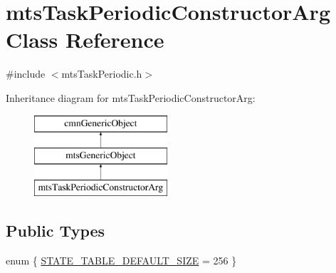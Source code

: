 \hypertarget{classmts_task_periodic_constructor_arg}{\section{mts\-Task\-Periodic\-Constructor\-Arg Class Reference}
\label{classmts_task_periodic_constructor_arg}
}


{\ttfamily \#include $<$mts\-Task\-Periodic.\-h$>$}

Inheritance diagram for mts\-Task\-Periodic\-Constructor\-Arg\-:\begin{figure}[H]
\begin{center}
\leavevmode
\includegraphics[height=3.000000cm]{d2/d2d/classmts_task_periodic_constructor_arg}
\end{center}
\end{figure}
\subsection*{Public Types}
\begin{DoxyCompactItemize}
\item 
enum \{ \hyperlink{classmts_task_periodic_constructor_arg_a9c81cd0ff169c6afedc5cf3e69f181a9a636d05314de683eba7b7c31f0627f5cb}{S\-T\-A\-T\-E\-\_\-\-T\-A\-B\-L\-E\-\_\-\-D\-E\-F\-A\-U\-L\-T\-\_\-\-S\-I\-Z\-E} = 256
 \}
\end{DoxyCompactItemize}

